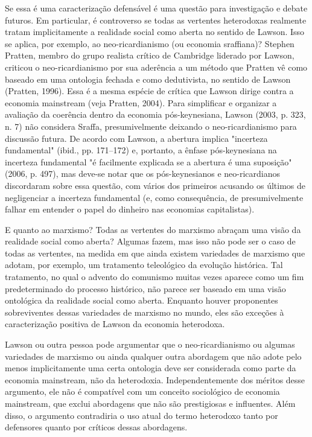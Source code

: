 \documentclass[12pt]{article}
\begin{document}
Se essa é uma caracterização defensável é uma questão para investigação e debate futuros. Em particular, é controverso se todas as vertentes heterodoxas realmente tratam implicitamente a realidade social como aberta no sentido de Lawson. Isso se aplica, por exemplo, ao neo-ricardianismo (ou economia sraffiana)? Stephen Pratten, membro do grupo realista crítico de Cambridge liderado por Lawson, criticou o neo-ricardianismo por sua aderência a um método que Pratten vê como baseado em uma ontologia fechada e como dedutivista, no sentido de Lawson (Pratten, 1996). Essa é a mesma espécie de crítica que Lawson dirige contra a economia mainstream (veja Pratten, 2004). Para simplificar e organizar a avaliação da coerência dentro da economia pós-keynesiana, Lawson (2003, p. 323, n. 7) não considera Sraffa, presumivelmente deixando o neo-ricardianismo para discussão futura. De acordo com Lawson, a abertura implica "incerteza fundamental" (ibid., pp. 171–172) e, portanto, a ênfase pós-keynesiana na incerteza fundamental "é facilmente explicada se a abertura é uma suposição" (2006, p. 497), mas deve-se notar que os pós-keynesianos e neo-ricardianos discordaram sobre essa questão, com vários dos primeiros acusando os últimos de negligenciar a incerteza fundamental (e, como consequência, de presumivelmente falhar em entender o papel do dinheiro nas economias capitalistas).

E quanto ao marxismo? Todas as vertentes do marxismo abraçam uma visão da realidade social como aberta? Algumas fazem, mas isso não pode ser o caso de todas as vertentes, na medida em que ainda existem variedades de marxismo que adotam, por exemplo, um tratamento teleológico da evolução histórica. Tal tratamento, no qual o advento do comunismo muitas vezes aparece como um fim predeterminado do processo histórico, não parece ser baseado em uma visão ontológica da realidade social como aberta. Enquanto houver proponentes sobreviventes dessas variedades de marxismo no mundo, eles são exceções à caracterização positiva de Lawson da economia heterodoxa.

Lawson ou outra pessoa pode argumentar que o neo-ricardianismo ou algumas variedades de marxismo ou ainda qualquer outra abordagem que não adote pelo menos implicitamente uma certa ontologia deve ser considerada como parte da economia mainstream, não da heterodoxia. Independentemente dos méritos desse argumento, ele não é compatível com um conceito sociológico de economia mainstream, que exclui abordagens que não são prestigiosas e influentes. Além disso, o argumento contradiria o uso atual do termo heterodoxo tanto por defensores quanto por críticos dessas abordagens.
\end{document}
